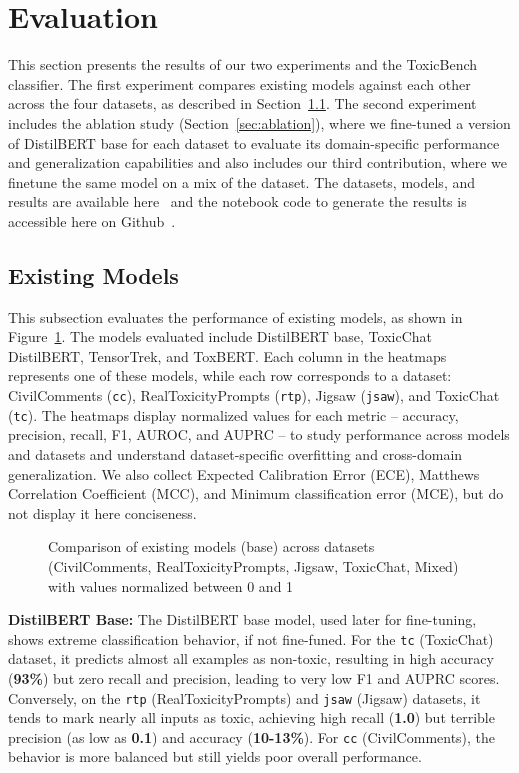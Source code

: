 \section{Evaluation}
This section presents the results of our two experiments and the ToxicBench classifier. The first experiment compares existing models against each other across the four datasets, as described in Section~\ref{sec:ex}. The second experiment includes the ablation study (Section~\ref{sec:ablation}), where we fine-tuned a version of DistilBERT base for each dataset to evaluate its domain-specific performance and generalization capabilities and also includes our third contribution, where we finetune the same model on a mix of the dataset. The datasets, models, and results are available here~\cite{datasets_models_results} and the notebook code to generate the results is accessible here on Github~\cite{datasets_models_results}. 

\subsection{Existing Models}
\label{sec:ex}

This subsection evaluates the performance of existing models, as shown in Figure~\ref{fig:performance_heatmaps}. The models evaluated include DistilBERT base, ToxicChat DistilBERT, TensorTrek, and ToxBERT. Each column in the heatmaps represents one of these models, while each row corresponds to a dataset: CivilComments (\texttt{cc}), RealToxicityPrompts (\texttt{rtp}), Jigsaw (\texttt{jsaw}), and ToxicChat (\texttt{tc}). The heatmaps display normalized values for each metric -- accuracy, precision, recall, F1, AUROC, and AUPRC -- to study performance across models and datasets and understand dataset-specific overfitting and cross-domain generalization. We also collect Expected Calibration Error (ECE), Matthews Correlation Coefficient (MCC), and Minimum classification error (MCE), but do not display it here conciseness.
\begin{figure}[ht]
    \centering
    
    \caption{Comparison of existing models (base) across datasets (CivilComments, RealToxicityPrompts, Jigsaw, ToxicChat, Mixed) with values
normalized between 0 and 1}
    \label{fig:performance_heatmaps}
\end{figure}

\textbf{DistilBERT Base:}
The DistilBERT base model, used later for fine-tuning, shows extreme classification behavior, if not fine-funed. For the \texttt{tc} (ToxicChat) dataset, it predicts almost all examples as non-toxic, resulting in high accuracy (\textbf{93\%}) but zero recall and precision, leading to very low F1 and AUPRC scores. Conversely, on the \texttt{rtp} (RealToxicityPrompts) and \texttt{jsaw} (Jigsaw) datasets, it tends to mark nearly all inputs as toxic, achieving high recall (\textbf{1.0}) but terrible precision (as low as \textbf{0.1}) and accuracy (\textbf{10-13\%}). For \texttt{cc} (CivilComments), the behavior is more balanced but still yields poor overall performance.

